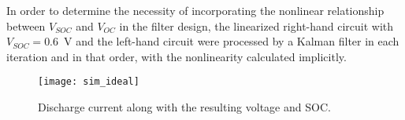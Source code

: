 In order to determine the necessity of incorporating the nonlinear relationship between $V_{SOC}$ and $V_{OC}$ in the filter design, the linearized right-hand circuit with $V_{SOC}=0.6$~V and the left-hand circuit were processed by a Kalman filter in each iteration and in that order, with the nonlinearity calculated implicitly.

\begin{figure}
\centering
\texttt{[image: sim\_ideal]}
\caption{Discharge current along with the resulting voltage and SOC.}
\label{fig:idealsim}
\end{figure}
